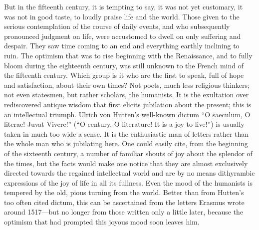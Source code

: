 But in the fifteenth century, it is tempting to say, it was not yet
customary, it was not in good taste, to loudly praise life and the
world. Those given to the serious contemplation of the course of daily
events, and who subsequently pronounced judgment on life, were
accustomed to dwell on only suffering and despair. They saw time coming
to an end and everything earthly inclining to ruin. The optimism that
was to rise beginning with the Renaissance, and
\protect\hypertarget{09_Chapter_Two__THE_CRAVING_FOR_A_M.xhtmlux5cux23page_31}{}{}to
fully bloom during the eighteenth century, was still unknown to the
French mind of the fifteenth century. Which group is it who are the
first to speak, full of hope and satisfaction, about their own times?
Not poets, much less religious thinkers; not even statesmen, but rather
scholars, the humanists. It is the exultation over rediscovered antique
wisdom that first elicits jubilation about the present; this is an
intellectual triumph. Ulrich von Hutten's well-known dictum ``O
saeculum, O literae! Juvat Vivere!'' (``O century, O literature! It is a
joy to live!'') is usually taken in much too wide a sense. It is the
enthusiastic man of letters rather than the whole man who is jubilating
here. One could easily cite, from the beginning of the sixteenth
century, a number of familiar shouts of joy about the splendor of the
times, but the facts would make one notice that they are almost
exclusively directed towards the regained intellectual world and are by
no means dithyrambic expressions of the joy of life in all its fullness.
Even the mood of the humanists is tempered by the old, pious turning
from the world. Better than from Hutten's too often cited dictum, this
can be ascertained from the letters Erasmus wrote around 1517---but no
longer from those written only a little later, because the optimism that
had prompted this joyous mood soon leaves him.

